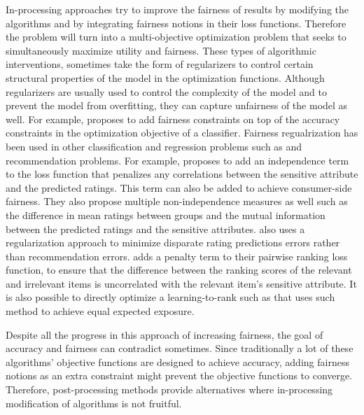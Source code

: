 In-processing approaches try to improve the fairness of results by modifying the algorithms and by integrating fairness notions in their loss functions. Therefore the problem will turn into a multi-objective optimization problem that seeks to simultaneously maximize utility and fairness.
These types of algorithmic interventions, sometimes take the form of regularizers to control certain structural properties of the model in the optimization functions. 
Although regularizers are usually used to control the complexity of the model and to prevent the model from overfitting, they can capture unfairness of the model as well. For example, \cite{zafar2017fairness} proposes to add fairness constraints on top of the accuracy constraints in the optimization objective of a classifier. Fairness regualrization has been used in other classification and regression problems such as \cite{kamishima2012fairness,berk2017convex} and recommendation problems. For example, \cite{kamishima2018recommendation, kamishima} proposes to add an independence term to the loss function that penalizes any correlations between the sensitive attribute and the predicted ratings. This term can also be added to achieve consumer-side fairness\cite{kamishima2017considerations}. They also propose multiple non-independence measures as well such as the difference in mean ratings between groups and the mutual information between the predicted ratings and the sensitive attributes. \cite{yao_huang_fatml-2017} also uses a regularization approach to minimize disparate rating predictions errors rather than recommendation errors. \cite{beutel2017data} adds a penalty term to their pairwise ranking loss function, to ensure that the difference between the ranking scores of the relevant and irrelevant items is uncorrelated with the relevant item's sensitive attribute. It is also possible to directly optimize a learning-to-rank such as \cite{diaz2020} that uses such method to achieve equal expected exposure.

Despite all the progress in this approach of increasing fairness, the goal of accuracy and fairness can contradict sometimes. Since traditionally a lot of these algorithms' objective functions are designed to achieve accuracy, adding fairness notions as an extra constraint might prevent the objective functions to converge. Therefore, post-processing methods provide alternatives where in-processing modification of algorithms is not fruitful.

